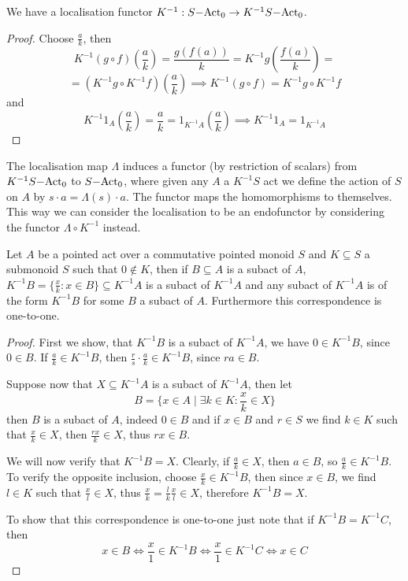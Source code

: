 \begin{proposition}
    We have a localisation functor $K^{-1}:S\mathrm{-Act}_0\to K^{-1}S\mathrm{-Act}_0$.
\end{proposition}
\begin{proof}[Proof]
    Choose $\frac{a}{k}$, then
    \[
    K^{-1}(g\circ f)\left(\frac{a}{k}\right) = \frac{g(f(a))}{k} = K^{-1}g\left(\frac{f(a)}{k}\right) =\] \[=(K^{-1}g\circ K^{-1}f)(\frac{a}{k}) \implies K^{-1}(g\circ f) = K^{-1}g\circ K^{-1}f
    \]
    and 
    \[
        K^{-1}1_A\left(\frac{a}{k}\right) = \frac{a}{k} = 1_{K^{-1}A}(\frac{a}{k}) \implies K^{-1}1_A = 1_{K^{-1}A}
    \]
\end{proof}
\begin{remark}
    The localisation map $\Lambda$ induces a functor (by restriction of scalars) from $K^{-1}S\mathrm{-Act}_0$ to $S\mathrm{-Act}_0$, where given any 
    $A$ a $K^{-1}S$ act we define the action of $S$ on $A$ by $s\cdot a = \Lambda(s)\cdot a$. The functor maps the 
    homomorphisms to themselves. This way we can consider the 
    localisation to be an endofunctor by considering the functor $\Lambda\circ K^{-1}$ instead. 
\end{remark}
\begin{proposition}
    Let $A$ be a pointed act over a commutative pointed monoid $S$ and $K\subseteq S$ a submonoid $S$ such that $0\not\in K$, then 
    if $B\subseteq A$ is a subact of $A$, $K^{-1}B = \{\frac{x}{k}: x \in B\}\subseteq K^{-1}A$ is a subact of $K^{-1}A$ and any subact of $K^{-1}A$ is of the form
    $K^{-1} B$ for some $B$ a subact of $A$. Furthermore this correspondence is one-to-one.
\end{proposition}
\begin{proof}
    First we show, that $K^{-1}B$ is a subact of $K^{-1}A$, we have $0\in K^{-1}B$, since $0\in B$. If $\frac{a}{k}\in K^{-1}B$, 
    then $\frac{r}{s}\cdot \frac{a}{k}\in K^{-1}B$, since $ra\in B$. \par 
    Suppose now that $X\subseteq K^{-1}A$ is a subact of $K^{-1}A$, then let \[B=\{x\in A \mid \exists k \in K : \frac{x}{k}\in X \}\]
    then $B$ is a subact of $A$, indeed $0\in B$ and if $x\in B$ and $r\in S$ we find $k\in K$ such that $\frac{x}{k}\in X$, then 
    $\frac{rx}{k}\in X$, thus $rx\in B$.\par 
    We will now verify that $K^{-1}B = X$. Clearly, if $\frac{a}{k}\in X$, then $a\in B$, so $\frac{a}{k}\in K^{-1}B$. To verify 
    the opposite inclusion, choose $\frac{x}{k}\in K^{-1}B$, then since $x\in B$, we find $l\in K$ such that $\frac{x}{l}\in X$, thus
    $\frac{x}{k} = \frac{l}{k}\frac{x}{l}\in X$, therefore $K^{-1}B = X$. \par 
    To show that this correspondence is one-to-one just note that if $K^{-1}B=K^{-1}C$, then 
    \[
        x\in B \iff \frac{x}{1}\in K^{-1}B \iff \frac{x}{1} \in K^{-1} C \iff x\in C
    \]
\end{proof}
